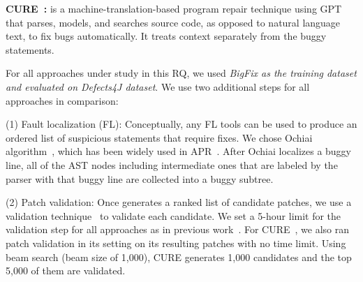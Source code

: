 

{\bf CURE~\cite{cure-icse21}: } is a machine-translation-based program
repair technique using GPT~\cite{radford2018improving} that parses,
models, and searches source code, as opposed to natural language text,
to fix bugs automatically. It treats context separately from the buggy
statements.




For all approaches under study in this RQ, we used {\em BigFix as the
training dataset and evaluated on Defects4J dataset}. 
We use two additional steps for all approaches in comparison:

(1) Fault localization (FL): Conceptually, any FL
tools can be used to produce an ordered list of suspicious
statements that require fixes. We chose Ochiai
algorithm~\cite{abreu2006evaluation, pearson2017evaluating}, which has
been widely used in
APR~\cite{jiang2018shaping,xiong2017precise,koyuncu2018fixminer,xin2017leveraging,wen2018context,liu2018lsrepair}.
After Ochiai localizes a buggy line, all of the AST nodes including
intermediate ones that are labeled by the parser with that buggy line
are collected into a buggy subtree.

(2) Patch validation: Once {\tool} generates a ranked list of
candidate patches, we use a validation
technique~\cite{saha2017elixir,jiang2018shaping} to validate each
candidate.
We set a 5-hour limit for the validation step for all approaches as in
previous work~\cite{icse20,tbar-issta19}.
For CURE~\cite{cure-icse21}, we also ran patch validation in its
setting on its resulting patches with no time limit. Using beam search
(beam size of 1,000), CURE generates 1,000 candidates and the top
5,000 of them are validated.

